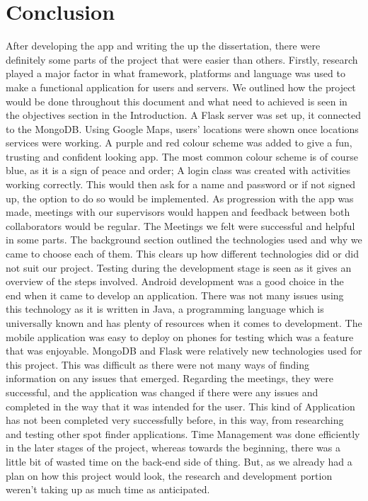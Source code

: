 \chapter{Conclusion}
After developing the app and writing the up the dissertation, there were definitely some parts of the project that were easier than others. Firstly, research played a major factor in what framework, platforms and language was used to make a functional application for users and servers. We outlined how the project would be done throughout this document and what need to achieved is seen in the objectives section in the Introduction. A Flask server was set up, it connected to the MongoDB.
Using Google Maps, users’ locations were shown once locations services were working. A purple and red colour scheme was added to give a fun, trusting and confident looking app. The most common colour scheme is of course blue, as it is a sign of peace and order; A login class was created with activities working correctly. This would then ask for a name and password or if not signed up, the option to do so would be implemented. As progression with the app was made, meetings with our supervisors would happen and feedback between both collaborators would be regular. The Meetings we felt were successful and helpful in some parts. The background section outlined the technologies used and why we came to choose each of them. This clears up how different technologies did or did not suit our project. Testing during the development stage is seen as it gives an overview of the steps involved. 
Android development was a good choice in the end when it came to develop an application. There was not many issues using this technology as it is written in Java, a programming language which is universally known and has plenty of resources when it comes to development. The mobile application was easy to deploy on phones for testing which was a feature that was enjoyable. MongoDB and Flask were relatively new technologies used for this project. This was diﬃcult as there were not many ways of ﬁnding information on any issues that emerged. Regarding the meetings, they were successful, and the application was changed if there were any issues and completed in the way that it was intended for the user. This kind of Application has not been completed very successfully before, in this way, from researching and testing other spot finder applications.
Time Management was done efficiently in the later stages of the project, whereas towards the beginning, there was a little bit of wasted time on the back-end side of thing. But, as we already had a plan on how this project would look, the research and development portion weren’t taking up as much time as anticipated.
